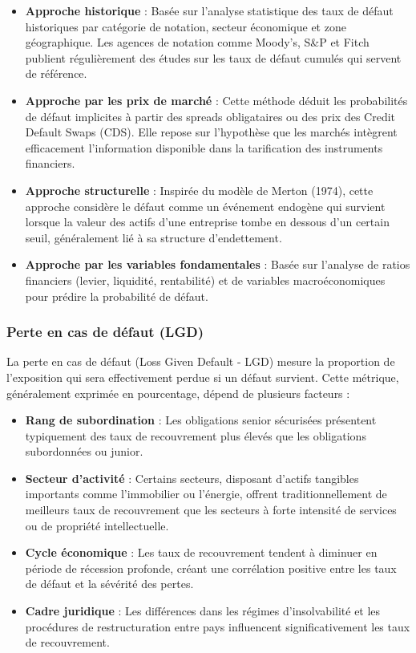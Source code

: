 \begin{itemize}
    \item \textbf{Approche historique} : Basée sur l'analyse statistique des taux de défaut historiques par catégorie de notation, secteur économique et zone géographique. Les agences de notation comme Moody's, S\&P et Fitch publient régulièrement des études sur les taux de défaut cumulés qui servent de référence.
    
    \item \textbf{Approche par les prix de marché} : Cette méthode déduit les probabilités de défaut implicites à partir des spreads obligataires ou des prix des Credit Default Swaps (CDS). Elle repose sur l'hypothèse que les marchés intègrent efficacement l'information disponible dans la tarification des instruments financiers.
    
    \item \textbf{Approche structurelle} : Inspirée du modèle de Merton (1974), cette approche considère le défaut comme un événement endogène qui survient lorsque la valeur des actifs d'une entreprise tombe en dessous d'un certain seuil, généralement lié à sa structure d'endettement.
    
    \item \textbf{Approche par les variables fondamentales} : Basée sur l'analyse de ratios financiers (levier, liquidité, rentabilité) et de variables macroéconomiques pour prédire la probabilité de défaut.
\end{itemize}

\subsubsection{Perte en cas de défaut (LGD)}

La perte en cas de défaut (Loss Given Default - LGD) mesure la proportion de l'exposition qui sera effectivement perdue si un défaut survient. Cette métrique, généralement exprimée en pourcentage, dépend de plusieurs facteurs :

\begin{itemize}
    \item \textbf{Rang de subordination} : Les obligations senior sécurisées présentent typiquement des taux de recouvrement plus élevés que les obligations subordonnées ou junior.
    
    \item \textbf{Secteur d'activité} : Certains secteurs, disposant d'actifs tangibles importants comme l'immobilier ou l'énergie, offrent traditionnellement de meilleurs taux de recouvrement que les secteurs à forte intensité de services ou de propriété intellectuelle.
    
    \item \textbf{Cycle économique} : Les taux de recouvrement tendent à diminuer en période de récession profonde, créant une corrélation positive entre les taux de défaut et la sévérité des pertes.
    
    \item \textbf{Cadre juridique} : Les différences dans les régimes d'insolvabilité et les procédures de restructuration entre pays influencent significativement les taux de recouvrement.
\end{itemize}

